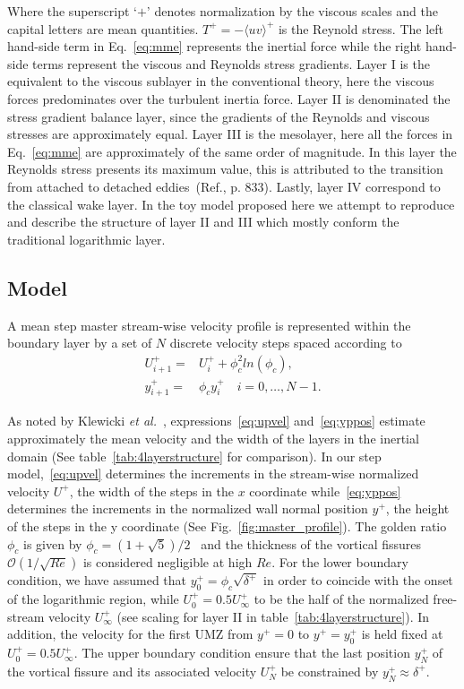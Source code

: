 \documentclass[aps,reprint,amsmath,amssymb,pra]{revtex4-1}%
\begin{document}
Where the superscript `$+$' denotes normalization by the viscous scales and the capital letters are mean quantities. $T^+=-\langle u v \rangle^+$ is the Reynold stress. The left hand-side term in Eq.~\ref{eq:mme} represents the inertial force while the right hand-side terms represent the viscous and Reynolds stress gradients.
Layer I is the equivalent to the viscous sublayer in the conventional theory, here the viscous forces predominates over the turbulent inertia force. Layer II is denominated the stress gradient balance layer, since  the gradients of the Reynolds and viscous stresses are approximately equal. Layer III is the mesolayer, here all the forces in Eq.~\ref{eq:mme} are approximately of the same order of magnitude. In this layer the Reynolds stress presents its maximum value, this is attributed to the transition from attached to detached eddies~(Ref.\citep{Klewickimmb}, p. 833). Lastly, layer IV correspond to the classical wake layer. In the toy model proposed here we attempt to reproduce and describe the structure of layer II and III which mostly conform the traditional logarithmic layer.

\subsection{Model\label{subsec:toymodel}}
A  mean step master stream-wise velocity profile is represented within the boundary layer by a set of $N$ discrete velocity steps spaced according to  
\begin{align}
U^+_{i+1}=&U^+_i+\phi_c^2 ln(\phi_c) \label{eq:upvel},\\
y^+_{i+1}=&\phi_c y^+_i\quad i=0,\ldots ,N-1. \label{eq:yppos}
\end{align}

As noted by Klewicki \textit{et al.}~\cite{klewicki2014}, expressions~\eqref{eq:upvel} and~\eqref{eq:yppos} estimate approximately the mean velocity and the width of the layers in the inertial domain (See table~\ref{tab:4layerstructure} for comparison). In our step model,~\eqref{eq:upvel} determines the increments in the stream-wise normalized velocity $U^+$, the width of the steps in the $x$ coordinate while~\eqref{eq:yppos} determines the increments in the normalized wall normal position $y^+$, the height of the steps in the y coordinate (See Fig.~\ref{fig:master_profile}). The golden ratio $\phi_c$ is given by $\phi_c=(1+\sqrt{5})/2$~\cite{klewicki2014} and the thickness of the vortical fissures $\mathcal{O}(1/\sqrt{Re})$ is considered negligible at high $Re$. For the lower boundary condition, we have assumed that $y^+_0=\phi_c\sqrt{\delta^+}$ in order to coincide with the onset of the logarithmic region, while $U^+_0=0.5 U_{\infty}^+$ to be the half of the normalized free-stream velocity $U_{\infty}^+$ (see scaling for layer II in table~\ref{tab:4layerstructure}). In addition, the velocity for the first UMZ from $y^+=0$ to $y^+=y^+_0$ is held fixed at $U^+_0=0.5 U_{\infty}^+$. 
The upper boundary condition ensure that the last position $y_{N}^+$ of the vortical fissure and its associated velocity $U^+_{N}$ be constrained by $y_{N}^+\approx\delta^+$.
\end{document}
